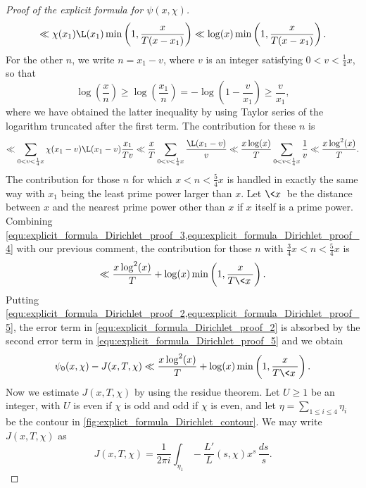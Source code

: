 \begin{proof}[Proof of the explicit formula for \(\psi(x,\chi)\)]
\begin{equation}
        \ll \chi(x_{1})\L(x_{1})\min\left(1,\frac{x}{T(x-x_{1})}\right) \ll \log(x)\min\left(1,\frac{x}{T(x-x_{1})}\right).
      \end{equation}
      For the other \(n\), we write \(n = x_{1}-v\), where \(v\) is an integer satisfying \(0 < v < \frac{1}{4}x\), so that
      \[
        \log\left(\frac{x}{n}\right) \ge \log\left(\frac{x_{1}}{n}\right) = -\log\left(1-\frac{v}{x_{1}}\right) \ge \frac{v}{x_{1}},
      \]
      where we have obtained the latter inequality by using Taylor series of the logarithm truncated after the first term. The contribution for these \(n\) is
      \begin{equation}\label{equ:explicit_formula_Dirichlet_proof_4}
        \ll \sum_{0 < v < \frac{1}{4}x}\chi(x_{1}-v)\L(x_{1}-v)\frac{x_{1}}{Tv} \ll \frac{x}{T}\sum_{0 < v < \frac{1}{4}x}\frac{\L(x_{1}-v)}{v} \ll \frac{x\log(x)}{T}\sum_{0 < v < \frac{1}{4}x}\frac{1}{v} \ll \frac{x\log^{2}(x)}{T}.
      \end{equation}
      The contribution for those \(n\) for which \(x < n < \frac{5}{4}x\) is handled in exactly the same way with \(x_{1}\) being the least prime power larger than \(x\). Let \(\<x\>\) be the distance between \(x\) and the nearest prime power other than \(x\) if \(x\) itself is a prime power. Combining \cref{equ:explicit_formula_Dirichlet_proof_3,equ:explicit_formula_Dirichlet_proof_4} with our previous comment, the contribution for those \(n\) with \(\frac{3}{4}x < n < \frac{5}{4}x\) is
      \begin{equation}\label{equ:explicit_formula_Dirichlet_proof_5}
        \ll \frac{x\log^{2}(x)}{T}+\log(x)\min\left(1,\frac{x}{T\<x\>}\right).
      \end{equation}
      Putting \cref{equ:explicit_formula_Dirichlet_proof_2,equ:explicit_formula_Dirichlet_proof_5}, the error term in \cref{equ:explicit_formula_Dirichlet_proof_2} is absorbed by the second error term in \cref{equ:explicit_formula_Dirichlet_proof_5} and we obtain
      \begin{equation}\label{equ:explicit_formula_Dirichlet_proof_6}
        \psi_{0}(x,\chi)-J(x,T,\chi) \ll \frac{x\log^{2}(x)}{T}+\log(x)\min\left(1,\frac{x}{T\<x\>}\right).
      \end{equation}
      Now we estimate \(J(x,T,\chi)\) by using the residue theorem. Let \(U \ge 1\) be an integer, with \(U\) is even if \(\chi\) is odd and odd if \(\chi\) is even, and let \(\eta = \sum_{1 \le i \le 4}\eta_{i}\) be the contour in \cref{fig:explict_formula_Dirichlet_contour}. We may write \(J(x,T,\chi)\) as
      \[
        J(x,T,\chi) = \frac{1}{2\pi i}\int_{\eta_{1}}-\frac{L'}{L}(s,\chi)x^{s}\,\frac{ds}{s}.
      \]


\end{proof}
